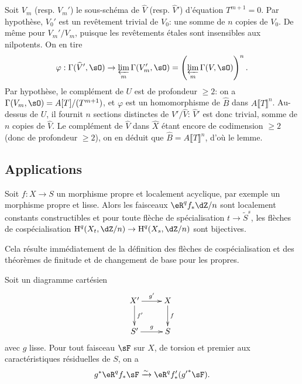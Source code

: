 Soit $V_m$ (resp. $V_m'$) le sous-schéma de $\widehat V$ (resp. $\widehat V'$) 
d'équation $T^{m+1} = 0$. Par hypothèse, $V_0'$ est un revêtement trivial 
de $V_0$: une somme de $n$ copies de $V_0$. De même pour $V_m'/V_m$, puisque 
les revêtements étales sont insensibles aux nilpotents. On en tire 
\[
  \varphi : \Gamma(\widehat V',\sO) \to \varprojlim_m \Gamma(V_m',\sO) = \left(\varprojlim_m \Gamma(V,\sO)\right)^n \text{.}
\]
Par hypothèse, le complément de $U$ est de profondeur $\geqslant 2$: on a 
$\Gamma(V_m,\sO)=A[T]/(T^{m+1})$, et $\varphi$ est un homomorphisme de 
$\widehat B$ dans $A\llbracket T\rrbracket^n$. Au-dessus de $U$, il fournit $n$ 
sections distinctes de $\widehat V'/\widehat V$: $\widehat V'$ est donc trivial, 
somme de $n$ copies de $\widehat V$. Le complément de $\widehat V$ dans 
$\widehat X$ étant encore de codimension $\geqslant 2$ (donc de profondeur 
$\geqslant 2$), on en déduit que $\widehat B=A\llbracket T\rrbracket^n$, 
d'où le lemme. 










\subsection{Applications}\label{I:5-3}





\begin{theorem}\label{I:5-3-1}
Soit $f:X\to S$ un morphisme propre et localement acyclique, par exemple un 
morphisme propre et lisse. Alors les faisceaux $\eR^q f_*\dZ/n$ sont localement 
constants constructibles et pour toute flèche de spécialisation 
$t\to\widetilde S^s$, les flèches de cospécialisation 
$\h^q(X_t,\dZ/n)\to\h^q(X_s,\dZ/n)$ sont bijectives.
\end{theorem}

Cela résulte immédiatement de la définition des flèches de 
cospécialisation et des théorèmes de finitude et de changement de base pour 
les propres. 





\begin{theorem}\label{I:5-3-2}
Soit un diagramme cartésien 
\[\xymatrix{
  X' \ar[r]^-{g'} \ar[d]^-{f'} 
    & X \ar[d]^-f \\
  S' \ar[r]^-{g} 
    & S
}\]
avec $g$ lisse. Pour tout faisceau $\sF$ sur $X$, de torsion et premier aux 
caractéristiques résiduelles de $S$, on a 
\[
  g^* \eR^q f_* \sF \iso \eR^q f_*'({g'}^* \sF) \text{.}
\]
\end{theorem}

